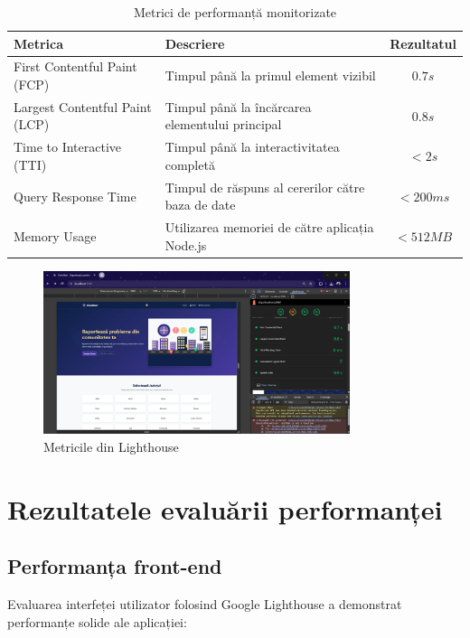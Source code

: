 \documentclass[12pt,a4paper]{report}
\begin{document}
\begin{table}[H]
\centering
\caption{Metrici de performanță monitorizate}
\label{tab:performance_metrics}
\begin{tabular}{|l|p{7cm}|c|}
\hline
\textbf{Metrica} & \textbf{Descriere} & \textbf{Rezultatul} \\
\hline
First Contentful Paint (FCP) & Timpul până la primul element vizibil & $0.7s$ \\
\hline
Largest Contentful Paint (LCP) & Timpul până la încărcarea elementului principal & $0.8s$ \\
\hline
Time to Interactive (TTI) & Timpul până la interactivitatea completă & $< 2s$ \\
\hline
Query Response Time & Timpul de răspuns al cererilor către baza de date & $< 200ms$ \\
\hline
Memory Usage & Utilizarea memoriei de către aplicația Node.js & $< 512MB$ \\
\hline
\end{tabular}
\end{table}

\begin{figure}[H]
    \centering
    \includegraphics[width=0.8\textwidth]{metrics.png}
    \caption{Metricile din Lighthouse}
    \label{fig:metrics}
\end{figure}

\section{Rezultatele evaluării performanței}

\subsection{Performanța front-end}

Evaluarea interfeței utilizator folosind Google Lighthouse a demonstrat performanțe solide ale aplicației:
\end{document}
